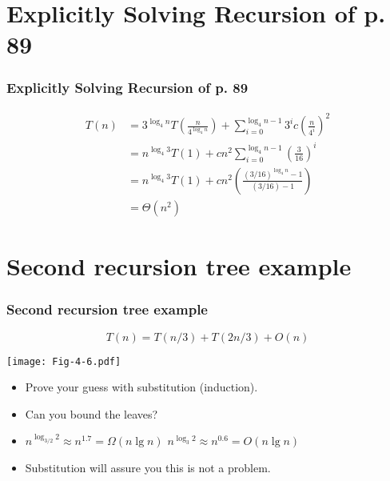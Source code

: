 \documentclass{beamer}
\newcommand{\sect}[1]{
\section{#1}
\begin{frame}[fragile]\frametitle{#1}
}
\newcommand{\bi}{\begin{itemize}}
\newcommand{\ii}{\item}
\newcommand{\ei}{\end{itemize}}
\begin{document}
\sect{Explicitly Solving Recursion of p. 89}
\begin{align*}
  T(n) &=
  3^{\log_4 n}T\left(\frac{n}{4^{\log_4 n}}\right)
  + \sum_{i=0}^{\log_4 n-1}3^{i}c\left(\frac{n}{4^{i}}\right)^2\\
  &=   n^{\log_4 3}T(1)
  + cn^2\sum_{i=0}^{\log_4 n-1}\left(\frac{3}{16}\right)^i\\
  &=
     n^{\log_4 3}T(1)
     + cn^2\left(\frac{(3/16)^{\log_4 n} - 1}{(3/16)-1}\right)\\
 &= \Theta(n^2)
     \end{align*}


\end{frame}


\sect{Second recursion tree example}
\footnotesize
\[ T(n) = T(n/3) + T(2n/3) + O(n) \]
\vfill

\texttt{[image: Fig-4-6.pdf]}
\bi
\pause
\ii Prove your guess with substitution (induction).
\pause
\ii Can you bound the leaves?
\pause
\ii $n^{\log_{3/2} 2} \approx n^{1.7} =\Omega(n\lg n)$
\hfill
$n^{\log_{3} 2} \approx n^{0.6} = O(n\lg n)$
\pause
\ii Substitution will assure you this is not a problem.
\ei

\end{frame}
\end{document}
